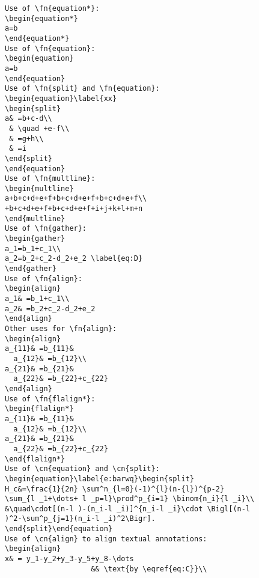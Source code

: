\documentclass[a4paper]{article}
\newcommand{\fn}[1]{\texttt{#1}}
\newcommand{\cn}[1]{\texttt{\char92 #1}}
\begin{document}
\begin{verbatim}
Use of \fn{equation*}:
\begin{equation*}
a=b
\end{equation*}
Use of \fn{equation}:
\begin{equation}
a=b
\end{equation}
Use of \fn{split} and \fn{equation}:
\begin{equation}\label{xx}
\begin{split}
a& =b+c-d\\
 & \quad +e-f\\
 & =g+h\\
 & =i
\end{split}
\end{equation}
Use of \fn{multline}:
\begin{multline}
a+b+c+d+e+f+b+c+d+e+f+b+c+d+e+f\\
+b+c+d+e+f+b+c+d+e+f+i+j+k+l+m+n
\end{multline}
Use of \fn{gather}:
\begin{gather}
a_1=b_1+c_1\\
a_2=b_2+c_2-d_2+e_2 \label{eq:D}
\end{gather}
Use of \fn{align}:
\begin{align}
a_1& =b_1+c_1\\
a_2& =b_2+c_2-d_2+e_2
\end{align}
Other uses for \fn{align}:
\begin{align}
a_{11}& =b_{11}&
  a_{12}& =b_{12}\\
a_{21}& =b_{21}&
  a_{22}& =b_{22}+c_{22}
\end{align}
Use of \fn{flalign*}:
\begin{flalign*}
a_{11}& =b_{11}&
  a_{12}& =b_{12}\\
a_{21}& =b_{21}&
  a_{22}& =b_{22}+c_{22}
\end{flalign*}
Use of \cn{equation} and \cn{split}:
\begin{equation}\label{e:barwq}\begin{split}
H_c&=\frac{1}{2n} \sum^n_{l=0}(-1)^{l}(n-{l})^{p-2}
\sum_{l _1+\dots+ l _p=l}\prod^p_{i=1} \binom{n_i}{l _i}\\
&\quad\cdot[(n-l )-(n_i-l _i)]^{n_i-l _i}\cdot \Bigl[(n-l
)^2-\sum^p_{j=1}(n_i-l _i)^2\Bigr].
\end{split}\end{equation}
Use of \cn{align} to align textual annotations:
\begin{align}
x& = y_1-y_2+y_3-y_5+y_8-\dots
                    && \text{by \eqref{eq:C}}\\

\end{verbatim}
\end{document}
